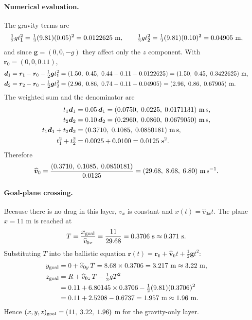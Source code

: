 \documentclass[11pt,a4paper]{article}
\begin{document}
\paragraph{Numerical evaluation.}
The gravity terms are
\begin{equation}
    \tfrac12 g t_1^2=\tfrac12(9.81)(0.05)^2=0.0122625\ {\rm m},\qquad
    \tfrac12 g t_2^2=\tfrac12(9.81)(0.10)^2=0.04905\ {\rm m},
\end{equation}
and since $\bm g=(0,0,-g)$ they affect only the $z$ component. With $\bm r_0=(0,0,0.11)$,
\begin{align}
    \bm d_1&=\bm r_1-\bm r_0-\tfrac12\bm g t_1^2
    =(1.50,\;0.45,\;0.44-0.11+0.0122625)=(1.50,\;0.45,\;0.3422625)\ {\rm m},\\
    \bm d_2&=\bm r_2-\bm r_0-\tfrac12\bm g t_2^2
    =(2.96,\;0.86,\;0.74-0.11+0.04905)=(2.96,\;0.86,\;0.67905)\ {\rm m}.
\end{align}
The weighted sum and the denominator are
\begin{align}
    t_1\bm d_1&=0.05\,\bm d_1=(0.0750,\;0.0225,\;0.0171131)\ {\rm m\,s},\\
    t_2\bm d_2&=0.10\,\bm d_2=(0.2960,\;0.0860,\;0.0679050)\ {\rm m\,s},\\
    t_1\bm d_1+t_2\bm d_2&=(0.3710,\;0.1085,\;0.0850181)\ {\rm m\,s},\\
    t_1^2+t_2^2&=0.0025+0.0100=0.0125\ {\rm s^2}.
\end{align}
Therefore
\begin{equation}
    \widehat{\bm v}_0=\frac{(0.3710,\;0.1085,\;0.0850181)}{0.0125}
    =(29.68,\;8.68,\;6.80)\ {\rm m\,s^{-1}}.
\end{equation}

\paragraph{Goal-plane crossing.}
Because there is no drag in this layer, $v_x$ is constant and $x(t)=\widehat v_{0x}t$. The plane $x=11$ m is reached at
\begin{equation}
    T=\frac{x_{\rm goal}}{\widehat v_{0x}}=\frac{11}{29.68}=0.3706\ {\rm s}\approx0.371\ {\rm s}.
\end{equation}
Substituting $T$ into the ballistic equation $\bm r(t)=\bm r_0+\widehat{\bm v}_0t+\tfrac12\bm g t^2$:
\begin{align}
    y_{\rm goal}&=0+\widehat v_{0y}\,T=8.68\times0.3706=3.217\ {\rm m}\approx3.22\ {\rm m},\\
    z_{\rm goal}&=R+\widehat v_{0z}\,T-\tfrac12 gT^2\notag\\
    &=0.11+6.80145\times0.3706-\tfrac12(9.81)(0.3706)^2\notag\\
    &=0.11+2.5208-0.6737=1.957\ {\rm m}\approx1.96\ {\rm m}.
\end{align}
Hence $(x,y,z)_{\rm goal}=(11,\;3.22,\;1.96)$ m for the gravity-only layer.
\end{document}
